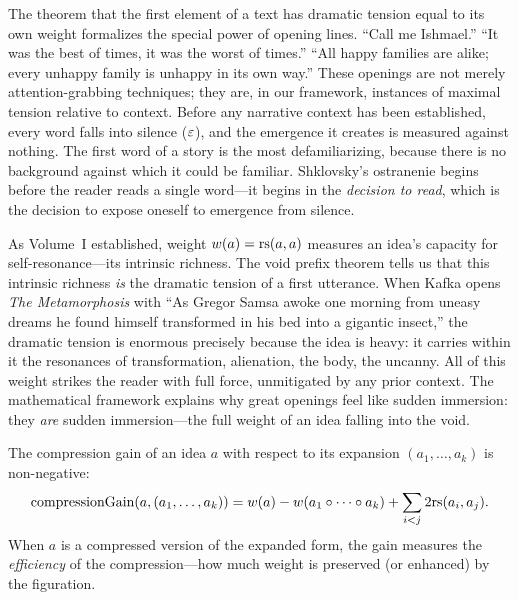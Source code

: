\begin{interpretation}
\label{interp:first-words}
The theorem that the first element of a text has dramatic tension equal to its own weight formalizes the special power of opening lines.  ``Call me Ishmael.''  ``It was the best of times, it was the worst of times.''  ``All happy families are alike; every unhappy family is unhappy in its own way.''  These openings are not merely attention-grabbing techniques; they are, in our framework, instances of maximal tension relative to context.  Before any narrative context has been established, every word falls into silence ($\varepsilon$), and the emergence it creates is measured against nothing.  The first word of a story is the most defamiliarizing, because there is no background against which it could be familiar.  Shklovsky's ostranenie begins before the reader reads a single word---it begins in the \emph{decision to read}, which is the decision to expose oneself to emergence from silence.

As Volume~I established, weight $w(a) = \mathrm{rs}(a, a)$ measures an idea's capacity for self-resonance---its intrinsic richness.  The void prefix theorem tells us that this intrinsic richness \emph{is} the dramatic tension of a first utterance.  When Kafka opens \textit{The Metamorphosis} with ``As Gregor Samsa awoke one morning from uneasy dreams he found himself transformed in his bed into a gigantic insect,'' the dramatic tension is enormous precisely because the idea is heavy: it carries within it the resonances of transformation, alienation, the body, the uncanny.  All of this weight strikes the reader with full force, unmitigated by any prior context.  The mathematical framework explains why great openings feel like sudden immersion: they \emph{are} sudden immersion---the full weight of an idea falling into the void.
\end{interpretation}

\begin{theorem}
\label{thm:compression-gain-defam}
The compression gain of an idea $a$ with respect to its expansion $(a_1, \ldots, a_k)$ is non-negative:
\[
  \text{compressionGain}(a, (a_1, \ldots, a_k)) = w(a) - w(a_1 \circ \cdots \circ a_k) + \sum_{i < j} 2\mathrm{rs}(a_i, a_j).
\]
When $a$ is a compressed version of the expanded form, the gain measures the \emph{efficiency} of the compression---how much weight is preserved (or enhanced) by the figuration.
\end{theorem}

